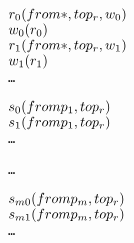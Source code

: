 \newsavebox{\TemplateboxTZero}
\begin{lrbox}{\TemplateboxTZero}
\begin{minipage}[t]{0.4\linewidth}
\large
\begin{alltt}
\(r\sb{0}(from \ast, to p\sb{r}, w\sb{0})\)
\(w\sb{0}(r\sb{0})\)
\(r\sb{1}(from \ast, to p\sb{r}, w\sb{1})\)
\(w\sb{1}(r\sb{1})\)
\ldots
\end{alltt}
\end{minipage}
\end{lrbox}

\newsavebox{\TemplateboxTOne}
\begin{lrbox}{\TemplateboxTOne}
\begin{minipage}[t]{0.35\linewidth}
\large
\begin{alltt}
\(s\sb{0}(from p\sb{1}, to p\sb{r})\)
\(s\sb{1}(from p\sb{1}, to p\sb{r})\)
\ldots
\end{alltt}
\end{minipage}
\end{lrbox}

\newsavebox{\TemplateboxTTwo}
\begin{lrbox}{\TemplateboxTTwo}
\begin{minipage}[t]{0.05\linewidth}
\large
\begin{alltt}
\ldots
\end{alltt}
\end{minipage}
\end{lrbox}

\newsavebox{\TemplateboxTThree}
\begin{lrbox}{\TemplateboxTThree}
\begin{minipage}[t]{0.35\linewidth}
\large
\begin{alltt}
\(s\sb{m0}(from p\sb{m}, to p\sb{r})\)
\(s\sb{m1}(from p\sb{m}, to p\sb{r})\)
\ldots
\end{alltt}
\end{minipage}
\end{lrbox}

\newcommand\examplefigtemplate{
\begin{figure*}[tb]
\begin{center}
\setlength{\tabcolsep}{2pt}
\begin{tabular}[t]{c|c|c|c}
$\mathit{p_r}$ & $\mathit{p_1}$ & $\ldots$ &$\mathit{p_m}$ \\
\hline
\scalebox{0.75}{\usebox{\TemplateboxTZero}}&
\scalebox{0.75}{\usebox{\TemplateboxTOne}} &
\scalebox{0.75}{\usebox{\TemplateboxTTwo}} &
\scalebox{0.75}{\usebox{\TemplateboxTThree}}

\end{tabular}
\end{center}
\caption{A template concurrent trace prorgam.}
\label{fig:Texample}
\end{figure*}
}







